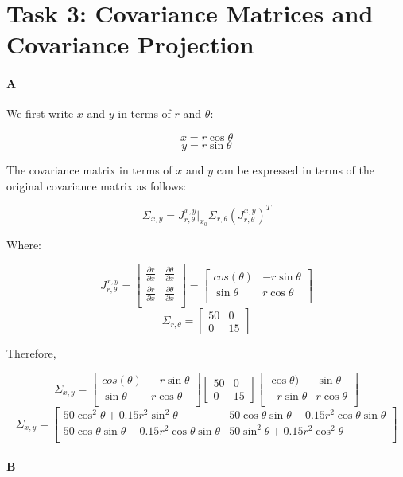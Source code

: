 \documentclass[12pt]{article}
\begin{document}
\section{Task 3: Covariance Matrices and Covariance Projection}

\paragraph{A}

We first write $x$ and $y$ in terms of $r$ and $\theta$:

\[x = r\cos\theta\]
\[y = r\sin\theta\]


The covariance matrix in terms of $x$ and $y$ can be expressed in terms of the original covariance matrix as follows:

\[
\Sigma_{x,y} = J_{r,\theta}^{x,y}|_{x_0}\Sigma_{r,\theta}\left(J_{r,\theta}^{x,y}\right)^T
\]

Where:

\[
J_{r,\theta}^{x,y} =
\left[ {\begin{array}{cc}
	\frac{\partial r}{\partial x} & \frac{\partial \theta}{\partial x}  \\
	\frac{\partial r}{\partial x} & \frac{\partial \theta}{\partial x}  \\
	 \end{array} } \right] =
\left[ {\begin{array}{cc}
	cos(\theta) & -r\sin\theta  \\
	\sin\theta & r\cos\theta  \\
	 \end{array} } \right]
\]
\[
\Sigma_{r,\theta} = 
\left[ {\begin{array}{cc}
	50 & 0  \\
	0 & 15 \end{array} }\right]
\]

Therefore,

\[
\Sigma_{x,y} = \left[ {\begin{array}{cc}
	cos(\theta) & -r\sin\theta  \\
	\sin\theta & r\cos\theta  \\
	 \end{array} } \right] 	 
	 	\left[ {\begin{array}{cc}
	50 & 0  \\
	0 & 15 \end{array} }\right]
	\left[ {\begin{array}{cc}
	\cos\theta) & \sin\theta  \\
	-r\sin\theta & r\cos\theta  \\
	 \end{array} } \right] 
\]
\[
\Sigma_{x,y} = \left[ {\begin{array}{cc}
	50\cos^2\theta + 0.15r^2\sin^2\theta & 50\cos\theta\sin\theta - 0.15r^2\cos\theta\sin\theta  \\
	50\cos\theta\sin\theta - 0.15r^2\cos\theta\sin\theta & 50\sin^2\theta + 0.15r^2\cos^2\theta \\
	 \end{array} } \right] 
\]

\paragraph{B}
\end{document}
